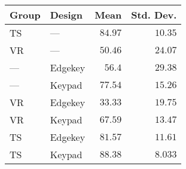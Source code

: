 \begin{tabular}{llrr}
\toprule
Group &   Design &    Mean &  Std. Dev. \\
\midrule
   TS &      --- & $84.97$ &    $10.35$ \\
   VR &      --- & $50.46$ &    $24.07$ \\
  --- &  Edgekey &  $56.4$ &    $29.38$ \\
  --- &   Keypad & $77.54$ &    $15.26$ \\
   VR &  Edgekey & $33.33$ &    $19.75$ \\
   VR &   Keypad & $67.59$ &    $13.47$ \\
   TS &  Edgekey & $81.57$ &    $11.61$ \\
   TS &   Keypad & $88.38$ &    $8.033$ \\
\bottomrule
\end{tabular}
